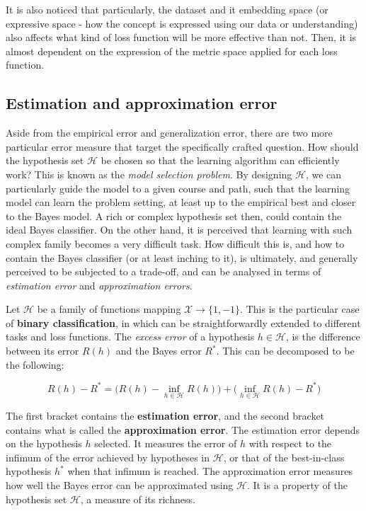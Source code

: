 It is also noticed that particularly, the dataset and it embedding space (or expressive space - how the concept is expressed using our data or understanding) also affects what kind of loss function will be more effective than not. Then, it is almost dependent on the expression of the metric space applied for each loss function. 

\subsection{Estimation and approximation error}
Aside from the empirical error and generalization error, there are two more particular error measure that target the specifically crafted question. How should the hypothesis set $\mathcal{H}$ be chosen so that the learning algorithm can efficiently work? This is known as the \textit{model selection problem}. By designing $\mathcal{H}$, we can particularly guide the model to a given course and path, such that the learning model can learn the problem setting, at least up to the empirical best and closer to the Bayes model. A rich or complex hypothesis set then, could contain the ideal Bayes classifier. On the other hand, it is perceived that learning with such complex family becomes a very difficult task. How difficult this is, and how to contain the Bayes classifier (or at least inching to it), is ultimately, and generally perceived to be subjected to a trade-off, and can be analysed in terms of \textit{estimation error} and \textit{approximation errors}. 

Let $\mathcal{H}$ be a family of functions mapping $\mathcal{X}\to\{1,-1\}$. This is the particular case of \textbf{binary classification}, in which can be straightforwardly extended to different tasks and loss functions. The \textit{excess error} of a hypothesis $h\in\mathcal{H}$, is the difference between its error $R(h)$ and the Bayes error $R^{*}$. This can be decomposed to be the following: 

\begin{equation}
    R(h) - R^{*} = \Big( R(h) - \inf_{h\in \mathcal{H}} R(h) \Big) + \Big( \inf_{h\in \mathcal{H}} R(h) - R^{*} \Big)
\end{equation}

The first bracket contains the \textbf{estimation error}, and the second bracket contains what is called the \textbf{approximation error}. The estimation error depends on the hypothesis $h$ selected. It measures the error of $h$ with respect to the infimum of the error achieved by hypotheses in $\mathcal{H}$, or that of the best-in-class hypothesis $h^{*}$ when that infimum is reached. The approximation error measures how well the Bayes error can be approximated using $\mathcal{H}$. It is a property of the hypothesis set $\mathcal{H}$, a measure of its richness. 

